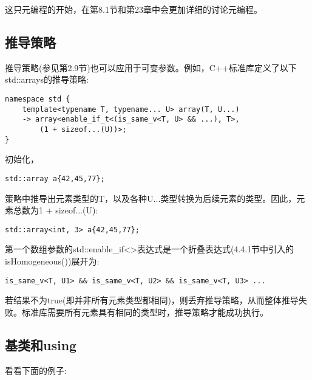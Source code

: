 这只元编程的开始，在第8.1节和第23章中会更加详细的讨论元编程。

\subsection{推导策略}

推导策略(参见第2.9节)也可以应用于可变参数。例如，C++标准库定义了以下std::arrays的推导策略:

\begin{lstlisting}[style=styleCXX]
namespace std {
	template<typename T, typename... U> array(T, U...)
	-> array<enable_if_t<(is_same_v<T, U> && ...), T>,
		(1 + sizeof...(U))>;
}
\end{lstlisting}

初始化，

\begin{lstlisting}[style=styleCXX]
std::array a{42,45,77};
\end{lstlisting}

策略中推导出元素类型的T，以及各种U...类型转换为后续元素的类型。因此，元素总数为1 + sizeof...(U):

\begin{lstlisting}[style=styleCXX]
std::array<int, 3> a{42,45,77};
\end{lstlisting}

第一个数组参数的std::enable\_if<>表达式是一个折叠表达式(4.4.1节中引入的isHomogeneous())展开为:

\begin{lstlisting}[style=styleCXX]
is_same_v<T, U1> && is_same_v<T, U2> && is_same_v<T, U3> ...
\end{lstlisting}

若结果不为true(即并非所有元素类型都相同)，则丢弃推导策略，从而整体推导失败。标准库需要所有元素具有相同的类型时，推导策略才能成功执行。

\subsection{基类和using}

看看下面的例子:

